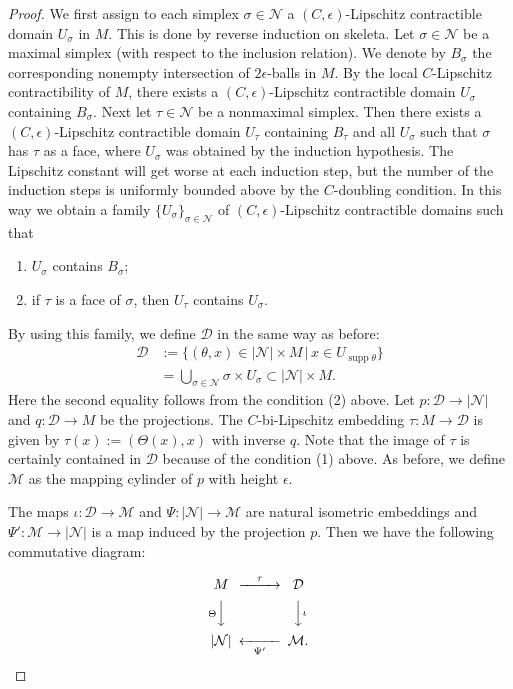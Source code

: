 \documentclass[a4paper,12pt]{amsart}
\theoremstyle{plain}
\theoremstyle{definition}
\numberwithin{thm}{section}
\numberwithin{equation}{section}
\DeclareMathOperator{\supp}{supp}
\begin{document}
\begin{proof}
We first assign to each simplex $\sigma\in\mathcal N$ a $(C,\epsilon)$-Lipschitz contractible domain $U_\sigma$ in $M$.
This is done by reverse induction on skeleta.
Let $\sigma\in\mathcal N$ be a maximal simplex (with respect to the inclusion relation).
We denote by $B_\sigma$ the corresponding nonempty intersection of $2\epsilon$-balls in $M$.
By the local $C$-Lipschitz contractibility of $M$, there exists a $(C,\epsilon)$-Lipschitz contractible domain $U_\sigma$ containing $B_\sigma$.
Next let $\tau\in\mathcal N$ be a nonmaximal simplex.
Then there exists a $(C,\epsilon)$-Lipschitz contractible domain $U_\tau$ containing $B_\tau$ and all $U_\sigma$ such that $\sigma$ has $\tau$ as a face, where $U_\sigma$ was obtained by the induction hypothesis.
The Lipschitz constant will get worse at each induction step, but the number of the induction steps is uniformly bounded above by the $C$-doubling condition.
In this way we obtain a family $\{U_\sigma\}_{\sigma\in\mathcal N}$ of $(C,\epsilon)$-Lipschitz contractible domains such that
\begin{enumerate}
\item $U_\sigma$ contains $B_\sigma$;
\item if $\tau$ is a face of $\sigma$, then $U_\tau$ contains $U_\sigma$.
\end{enumerate}

By using this family, we define $\mathcal D$ in the same way as before:
\begin{align*}
\mathcal D&:=\{(\theta, x)\in |\mathcal N|\times M \,|\, x\in U_{\supp\theta}\} \\
 & =\bigcup_{\sigma\in\mathcal N} \sigma\times U_\sigma\subset |\mathcal N|\times M.
\end{align*}
Here the second equality follows from the condition (2) above.
Let $p:\mathcal D\to|\mathcal N|$ and $q:\mathcal D\to M$ be the projections.
The $C$-bi-Lipschitz embedding $\tau:M\to\mathcal D$ is given by $\tau(x):=(\Theta(x),x)$ with inverse $q$.
Note that the image of $\tau$ is certainly contained in $\mathcal D$ because of the condition (1) above.
As before, we define $\mathcal M$ as the mapping cylinder of $p$ with height $\epsilon$.

The maps $\iota:\mathcal D\to\mathcal M$ and $\Psi:|\mathcal N|\to\mathcal M$ are natural isometric embeddings and $\Psi':\mathcal M\to|\mathcal N|$ is a map induced by the projection $p$.
Then we have the following commutative diagram:

\begin{equation}\label{eq:Theta'}
\begin{CD}
M @>\tau>> \mathcal D \\
@V\Theta VV @VV\iota V \\
|\mathcal N| @<<\Psi'< \mathcal M.
\end{CD}
\end{equation}


\end{proof}
\end{document}
